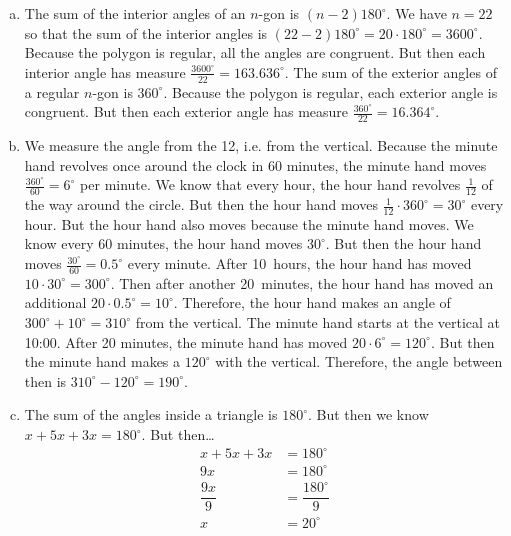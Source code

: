 \documentclass[11pt,letterpaper]{article}
\begin{document}
\sol 
\begin{enumerate}[(a)]
\item The sum of the interior angles of an $n$-gon is $(n - 2)180^\circ$. We have $n= 22$ so that the sum of the interior angles is $(22 - 2) 180^\circ= 20 \cdot 180^\circ= 3600^\circ$. Because the polygon is regular, all the angles are congruent. But then each interior angle has measure $\frac{3600^\circ}{22}= 163.636^\circ$. The sum of the exterior angles of a regular $n$-gon is $360^\circ$. Because the polygon is regular, each exterior angle is congruent. But then each exterior angle has measure $\frac{360^\circ}{22}= 16.364^\circ$. \pspace

\item We measure the angle from the 12, i.e. from the vertical. Because the minute hand revolves once around the clock in 60 minutes, the minute hand moves $\frac{360^\circ}{60}= 6^\circ$ per minute. We know that every hour, the hour hand revolves $\frac{1}{12}$ of the way around the circle. But then the hour hand moves $\frac{1}{12} \cdot 360^\circ= 30^\circ$ every hour. But the hour hand also moves because the minute hand moves. We know every 60 minutes, the hour hand moves $30^\circ$. But then the hour hand moves $\frac{30^\circ}{60}= 0.5^\circ$ every minute. After 10~hours, the hour hand has moved $10 \cdot 30^\circ= 300^\circ$. Then after another 20~minutes, the hour hand has moved an additional $20 \cdot 0.5^\circ= 10^\circ$. Therefore, the hour hand makes an angle of $300^\circ + 10^\circ= 310^\circ$ from the vertical. The minute hand starts at the vertical at 10:00. After 20 minutes, the minute hand has moved $20 \cdot 6^\circ= 120^\circ$. But then the minute hand makes a $120^\circ$ with the vertical. Therefore, the angle between then is $310^\circ - 120^\circ= 190^\circ$. \pspace

\item The sum of the angles inside a triangle is $180^\circ$. But then we know $x + 5x + 3x= 180^\circ$. But then\dots
	\[
	\begin{aligned}
	x + 5x + 3x&= 180^\circ \\[0.3cm]
	9x&= 180^\circ \\[0.3cm]
	\dfrac{9x}{9}&= \dfrac{180^\circ}{9} \\[0.3cm]
	x&= 20^\circ
	\end{aligned}
	\]
\end{enumerate}



\newpage
\end{document}
